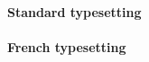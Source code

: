 \documentclass[varwidth, border = 3pt]{standalone}
\begin{document}
\begin{multicols}{2}
    \paragraph{Standard typesetting}
    \leavevmode

    \example{(}{)}

    \paragraph{French typesetting}
    \leavevmode

    \example{]}{[}
\end{multicols}
\end{document}
